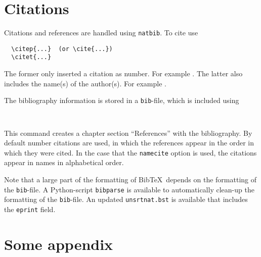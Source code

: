 \section{Citations}

Citations and references are handled using \texttt{natbib}. To cite use
\begin{verbatim}
  \citep{...}  (or \cite{...})
  \citet{...}
\end{verbatim}
The former only inserted a citation as number. For example \citep{geus}. The latter also includes the name(s) of the author(s). For example \citet{geus,wiki}.

The bibliography information is stored in a \texttt{bib}-file, which is included using
\begin{verbatim}
  
\end{verbatim}
This command creates a chapter section ``References'' with the bibliography. By default number citations are used, in which the references appear in the order in which they were cited. In the case that the \verb|namecite| option is used, the citations appear in names in alphabetical order.

Note that a large part of the formatting of Bib\TeX~depends on the formatting of the \texttt{bib}-file. A Python-script \texttt{bibparse} is available to automatically clean-up the formatting of the \texttt{bib}-file. An updated \texttt{unsrtnat.bst} is available that includes the \texttt{eprint} field.



\appendix

\section{Some appendix}
